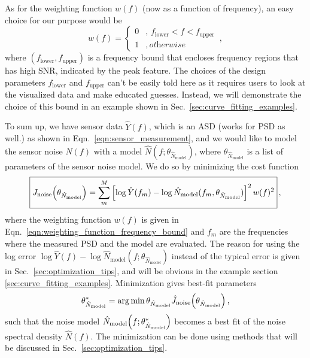 As for the weighting function $w(f)$ (now as a function of frequency), an easy choice for our purpose would be
\begin{equation}
	w(f)=
	\begin{cases}
		0 &,\, f_\mathrm{lower}<f<f_\mathrm{upper} \\
		1 &,\, \textit{otherwise}
	\end{cases}
	\,,
	\label{eqn:weighting_function_frequency_bound}
\end{equation}
where $\left(f_\mathrm{lower},f_\mathrm{upper}\right)$ is a frequency bound that encloses frequency regions that has high SNR, indicated by the peak feature.
The choices of the design parameters $f_\mathrm{lower}$ and $f_\mathrm{upper}$ can't be easily told here as it requires users to look at the visualized data and make educated guesses.
Instead, we will demonstrate the choice of this bound in an example shown in Sec.~\ref{sec:curve_fitting_examples}.

To sum up, we have sensor data $\hat{Y}(f)$, which is an ASD (works for PSD as well.) as shown in Eqn.~\eqref{eqn:sensor_measurement}, and we would like to model the sensor noise $\hat{N}(f)$ with a model $\hat{N}(f;\theta_{\hat{N}_\mathrm{model}})$, where $\theta_{\hat{N}_\mathrm{model}}$ is a list of parameters of the sensor noise model.
We do so by minimizing the cost function
\begin{equation}
	\boxed{
		J_\mathrm{noise}\mleft(\theta_{\hat{N}_\mathrm{model}}\mright)=\sum_m^M\left[\log\hat{Y}(f_m)-\log\hat{N}_\mathrm{model}(f_m, \theta_{\hat{N}_\mathrm{model}})\right]^2 w(f)^2
	}\,,
	\label{eqn:noise_cost_function}
\end{equation}
where the weighting function $w(f)$ is given in Eqn.~\eqref{eqn:weighting_function_frequency_bound} and $f_m$ are the frequencies where the measured PSD and the model are evaluated.
The reason for using the log error $\log\hat{Y}(f) - \log\hat{N}_\mathrm{model}(f;\theta_{\hat{N}_\mathrm{model}})$ instead of the typical error is given in Sec.~\ref{sec:optimization_tips}, and will be obvious in the example section \ref{sec:curve_fitting_examples}.
Minimization gives best-fit parameters
\begin{equation}
	\theta_{\hat{N}_\mathrm{model}}^*=\arg\min{\theta_{\hat{N}_\mathrm{model}}} \hat{J}_\mathrm{noise}\mleft(\theta_{\hat{N}_\mathrm{model}}\mright)\,,
\end{equation} such that the noise model $\hat{N}_\mathrm{model}\mleft(f;\theta_{\hat{N}_\mathrm{model}}^*\mright)$ becomes a best fit of the noise spectral density $\hat{N}(f)$.
The minimization can be done using methods that will be discussed in Sec.~\ref{sec:optimization_tips}.
